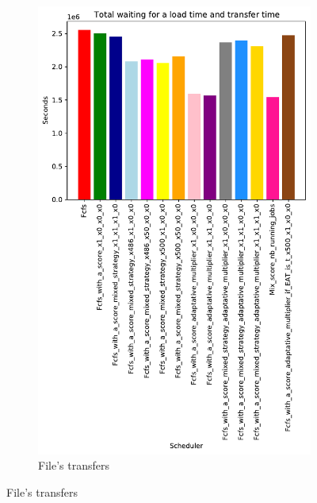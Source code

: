 \documentclass[a4paper]{article}
\begin{document}
\begin{figure}[H]
\begin{subfigure}[b]{0.4\linewidth}\centering\includegraphics[width=0.9\linewidth]{MBSS/plot/Results_FCFS_Score_Adaptative_Multiplier_2022-08-16->2022-08-16_V9271_Total_waiting_for_a_load_time_and_transfer_time_450_128_32_256_4_1024.pdf}\caption{File's transfers}\end{subfigure}

\end{figure}
\end{document}
